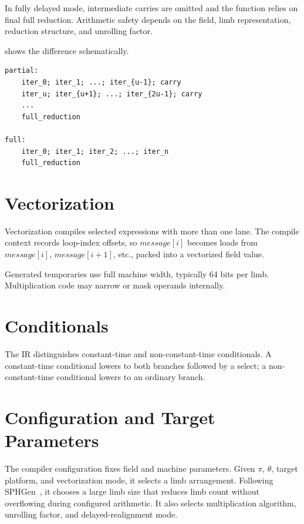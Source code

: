 In fully delayed mode, intermediate carries are omitted and the function relies on final full reduction. Arithmetic safety depends on the field, limb representation, reduction structure, and unrolling factor.

 shows the difference schematically.

\begin{lstlisting}[style=thesisIR,caption={Schematic carry-placement strategies for a reduction loop.},label={lst:carry-delay-schedule}]
partial:
    iter_0; iter_1; ...; iter_{u-1}; carry
    iter_u; iter_{u+1}; ...; iter_{2u-1}; carry
    ...
    full_reduction

full:
    iter_0; iter_1; iter_2; ...; iter_n
    full_reduction
\end{lstlisting}

\section{Vectorization}
\label{sec:compiler-vectorization}

Vectorization compiles selected expressions with more than one lane. The compile context records loop-index offsets, so \(message[i]\) becomes loads from \(message[i]\), \(message[i+1]\), etc., packed into a vectorized field value.

Generated temporaries use full machine width, typically 64 bits per limb. Multiplication code may narrow or mask operands internally.

\section{Conditionals}
\label{sec:compiler-conditionals}

The IR distinguishes constant-time and non-constant-time conditionals. A constant-time conditional lowers to both branches followed by a select; a non-constant-time conditional lowers to an ordinary branch.

\section{Configuration and Target Parameters}
\label{sec:configuration-targets}

The compiler configuration fixes field and machine parameters. Given \(\pi\), \(\theta\), target platform, and vectorization mode, it selects a limb arrangement. Following SPHGen~\cite{pegolotti2026sphgen}, it chooses a large limb size that reduces limb count without overflowing during configured arithmetic. It also selects multiplication algorithm, unrolling factor, and delayed-realignment mode.

